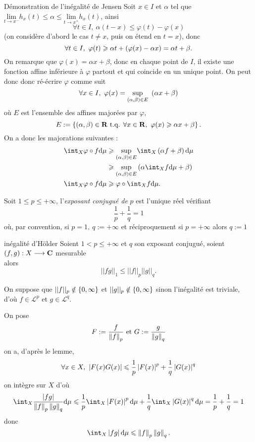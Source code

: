 \documentclass[a4paper,11pt, twoside]{article}
\begin{document}
\begin{ProofC}{Démonstration de l'inégalité de Jensen}
  Soit $x\in I$ et $\alpha$ tel que $\underset{t\to x^-}{\mathrm{lim}}h_x(t)\leqslant \alpha\leqslant \underset{t\to x^+}{\mathrm{lim}}h_x(t)$, ainsi 
  $$\forall t\in I,\ \alpha(t-x)\leqslant \varphi(t)-\varphi(x)$$
  (on considère d'abord le cas $t\neq x$, puis on étend en $t=x$), donc 
  $$\forall t\in I,\ \varphi(t)\geqslant \alpha t +\left(\varphi(x)-\alpha x\right)=\alpha t +\beta.$$
  On remarque que $\varphi(x)=\alpha x+\beta$, donc en chaque point de $I$, il existe une fonction affine inférieure à $\varphi$ partout et qui coincide en un unique point. On peut donc donc ré-écrire $\varphi$ comme suit
  $$\forall x\in I,\ \varphi(x)=\underset{(\alpha,\beta)\in E}{\mathrm{sup}}\ \Par{\alpha x+\beta}$$
  où $E$ est l'ensemble des affines majorées par $\varphi$, 
  $$E:=\left\{(\alpha,\beta)\in \mathbf R\text{ t.q. } \forall x\in\mathbf R,\ \varphi(x)\geqslant \alpha x+\beta\right\}.$$
  On a donc les majorations suivantes :
  \begin{align*}
    \int_X\varphi\circ f\mathrm d\mu&\geqslant \underset{(\alpha,\beta)\in E}{\mathrm{sup}}\int_X \Par{\alpha f+\beta}\mathrm d\mu\\
    &\geqslant \underset{(\alpha,\beta)\in E}{\mathrm{sup}} \Par{\alpha\int_X f\mathrm d\mu+\beta}\\
     \int_X\varphi\circ f\mathrm d\mu&\geqslant \varphi\circ\int_Xf\mathrm d\mu.
  \end{align*}
\end{ProofC}


\begin{Def}
  Soit $1\leqslant p\leqslant+\infty$, l'\emph{exposant conjugué de }$p$ est l'unique réel vérifiant
  $$\frac1p+\frac1q=1$$
  où, par convention, si $p=1,\ q:=+\infty$ et réciproquement si $p=+\infty$ alors $q:=1$
\end{Def}


\begin{propC}{inégalité d'Hölder}
  Soient $1< p\leqslant+\infty$ et $q$ son exposant conjugué, soient $(f,g):X\longrightarrow\mathbf C$ mesurable\\

  alors
  $$||fg||_1\leqslant||f||_p||g||_q.$$
\end{propC}
  
\begin{Proof}
  On suppose que $||f||_p\notin \left\{0,\infty\right\}$ et $||g||_p\notin \left\{0,\infty\right\}$ sinon l'inégalité est triviale, d'où $f\in\mathcal L^p$ et $g\in\mathcal L^q$.

  On pose 
  $$F:=\frac{f}{\left\lVert f\right\rVert_p}\text{ et }G:=\frac{g}{\left\lVert g\right\rVert_q}$$
  on a, d'après le lemme,
  $$\forall x\in X,\ \left| F(x)G(x)\right|\leqslant \frac{1}{p}\left| F(x)\right|^p+\frac{1}{q}\left| G(x)\right|^q$$
  on intègre sur $X$ d'où
  $$\int_X\frac{\abs{fg}}{\norm{f}_p\norm{g}_q}\mathrm d\mu\leqslant \frac{1}{p}\int_X\abs{F(x)}^p\mathrm d\mu+\frac{1}{q}\int_X\abs{G(x)}^q\mathrm d\mu=\frac1p+\frac1q=1$$
  donc
  $$\int_X\abs{fg}\mathrm d\mu\leqslant \norm{f}_p\norm{g}_q.$$
\end{Proof}
\end{document}
